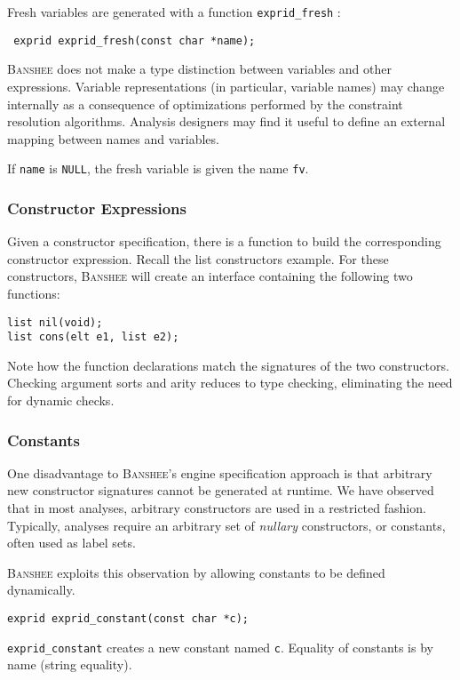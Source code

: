 \documentclass{article}
\newcommand{\banshee}{\textsc{Banshee}}
\begin{document}
Fresh variables are generated with a function \texttt{exprid\_fresh} :
\begin{verbatim}
 exprid exprid_fresh(const char *name);
\end{verbatim}

\banshee{} does not make a type distinction between variables and other 
expressions. Variable representations (in particular, variable names) may 
change internally as a consequence of optimizations performed by the 
constraint resolution algorithms. Analysis designers may find it useful to
define an external mapping between names and variables.

If \texttt{name} is \texttt{NULL}, the fresh variable is given the name
\texttt{fv}.

\subsubsection{Constructor Expressions}

Given a constructor specification, there is a function to build the 
corresponding constructor expression. Recall the list constructors example.
For these constructors, \banshee{} will create an interface containing the 
following two functions:
\begin{verbatim}
list nil(void);
list cons(elt e1, list e2);
\end{verbatim}

Note how the function declarations match the signatures of the two 
constructors. Checking argument sorts and arity reduces to type checking, 
eliminating the need for dynamic checks. 

\subsubsection{Constants}

One disadvantage to \banshee{}'s engine specification approach is that 
arbitrary new constructor signatures cannot be generated at runtime. 
We have observed that in most analyses, arbitrary constructors are used
in a restricted fashion. Typically, analyses require an arbitrary set
of \emph{nullary} constructors, or constants, often used as label sets.

\banshee{} exploits this observation by allowing constants to be
defined dynamically.
\begin{verbatim}
exprid exprid_constant(const char *c);
\end{verbatim}

\texttt{exprid\_constant} creates a new constant named \texttt{c}. 
Equality of constants is by name (string equality).
\end{document}
